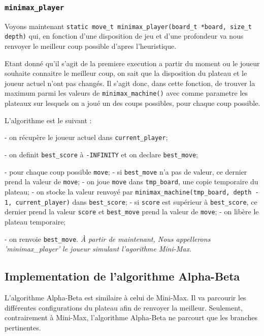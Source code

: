 \documentclass{report}
\begin{document}
\subsubsection{\texttt{minimax\_player}}

Voyons maintenant \texttt{static move\_t minimax\_player(board\_t *board, size\_t depth)} qui, en fonction d'une disposition de jeu et d'une profondeur va nous renvoyer le meilleur coup possible d'apres l'heuristique.

Etant donné qu'il s'agit de la premiere execution a partir du moment ou le joueur souhaite connaitre le meilleur coup, on sait que la disposition du plateau et le joueur actuel n'ont pas changés. Il s'agit donc, dans cette fonction, de trouver la maximum parmi les valeurs de \texttt{minimax\_machine()} avec comme parametre les plateaux sur lesquels on a joué un des coups possibles, pour chaque coup possible.

L'algorithme est le suivant :

- on récupère le joueur actuel dans \texttt{current\_player};

- on definit \texttt{best\_score} à \texttt{-INFINITY} et on declare \texttt{best\_move};

- pour chaque coup possible \texttt{move};
\tabto{1 cm} - si \texttt{best\_move} n'a pas de valeur, ce dernier prend la valeur de \texttt{move};
\tabto{1 cm} - on joue \texttt{move} dans \texttt{tmp\_board}, une copie temporaire du plateau;
\tabto{1 cm} - on stocke la valeur renvoyé par \texttt{minimax\_machine(tmp\_board, depth - 1, current\_player)} dans \texttt{best\_score};
\tabto{1 cm} - si \texttt{score} est supérieur à \texttt{best\_score}, ce dernier prend la valeur \texttt{score} et \texttt{best\_move} prend la valeur de \texttt{move};
\tabto{1 cm} - on libère le plateau temporaire;

- on renvoie \texttt{best\_move}.\newline
\newline
\textit{À partir de maintenant, Nous appellerons 'minimax\_player' le joueur simulant l'agorithme Mini-Max.}

\subsection{Implementation de l'algorithme Alpha-Beta}

L'algorithme Alpha-Beta est similaire à celui de Mini-Max. Il va parcourir les différentes configurations du plateau afin de renvoyer la meilleur. Seulement, contrairement à Mini-Max, l'algorithme Alpha-Beta ne parcourt que les branches pertinentes.
\end{document}
